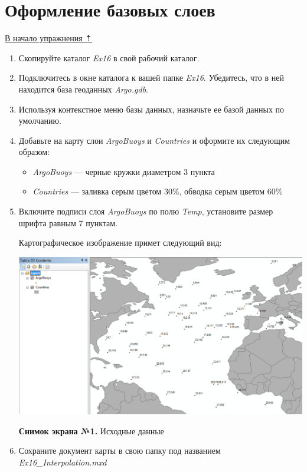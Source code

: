 \documentclass[]{book}
\providecommand{\tightlist}{%
  \setlength{\itemsep}{0pt}\setlength{\parskip}{0pt}}
\theoremstyle{definition}
\theoremstyle{definition}
\theoremstyle{definition}
\theoremstyle{remark}
\begin{document}
\hypertarget{interpolation-base}{%
\section{Оформление базовых слоев}\label{interpolation-base}}

\protect\hyperlink{interpolation}{В начало упражнения ⇡}

\begin{enumerate}
\def\labelenumi{\arabic{enumi}.}
\item
  Скопируйте каталог \emph{Ex16} в свой рабочий каталог.
\item
  Подключитесь в окне каталога к вашей папке \emph{Ex16}. Убедитесь, что
  в ней находится база геоданных \emph{Argo.gdb}.
\item
  Используя контекстное меню базы данных, назначьте ее базой данных по
  умолчанию.
\item
  Добавьте на карту слои \emph{ArgoBuoys} и \emph{Countries} и оформите
  их следующим образом:

  \begin{itemize}
  \tightlist
  \item
    \emph{ArgoBuoys} --- черные кружки диаметром 3 пункта
  \item
    \emph{Countries} --- заливка серым цветом 30\%, обводка серым цветом
    60\%
  \end{itemize}
\item
  Включите подписи слоя \emph{ArgoBuoys} по полю \emph{Temp}, установите
  размер шрифта равным 7 пунктам.

  Картографическое изображение примет следующий вид:

  \includegraphics{images/Ex16/image7.png}

  \textbf{Снимок экрана №1.} Исходные данные
\item
  Сохраните документ карты в свою папку под названием
  \emph{Ex16\_Interpolation.mxd}
\end{enumerate}
\end{document}
